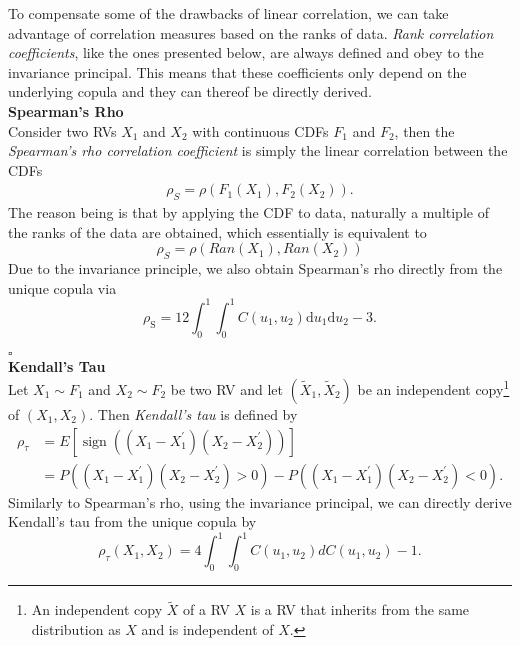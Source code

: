 
To compensate some of the drawbacks of linear correlation, we can take advantage of correlation measures based on the ranks of data. \textit{Rank correlation coefficients}, like the ones presented below, are always defined and obey to the invariance principal. This means that these coefficients only depend on the underlying copula and they can thereof be directly derived.\\

\textbf{Spearman's Rho}\\
Consider two \acp{RV} $X_1$ and $X_2$ with continuous \acp{CDF} $F_1$ and $F_2$, then the \textit{Spearman's rho correlation coefficient} is simply the linear correlation between the \acp{CDF}
\begin{align}
\rho_{S}=\rho\left(F_{1}\left(X_{1}\right), F_{2}\left(X_{2}\right)\right).
\end{align}
The reason being is that by applying the \ac{CDF} to data, naturally a multiple of the ranks of the data are obtained, which essentially is equivalent to
\begin{equation}
\rho_S = \rho ( Ran(X_1), Ran(X_2) )
\end{equation}
Due to the invariance principle, we also obtain Spearman's rho directly from the unique copula via
\begin{equation}
\rho_{\mathrm{S}}=12 \int_{0}^{1} \int_{0}^{1} C\left(u_{1}, u_{2}\right) \mathrm{d} u_{1} \mathrm{d} u_{2}-3.
\end{equation}

\hfill $\square$ \\


\textbf{Kendall's Tau}\\
Let $X_1 \sim F_1$ and $X_2 \sim F_2$ be two \ac{RV} and let $(\tilde{X}_{1}, \tilde{X}_{2})$ be an independent copy\footnote{An independent copy $\tilde{X}$ of a RV $X$ is a RV that inherits from the same distribution as $X$ and is independent of $X$.} of $({X}_{1}, {X}_{2})$. Then \textit{Kendall's tau} is defined by 
\begin{equation}
\begin{aligned}
\rho_{\tau} &={E}\left[\operatorname{sign}\left(\left(X_{1}-X_{1}^{\prime}\right)\left(X_{2}-X_{2}^{\prime}\right)\right)\right] \\
&={P}\left(\left(X_{1}-X_{1}^{\prime}\right)\left(X_{2}-X_{2}^{\prime}\right)>0\right)-{P}\left(\left(X_{1}-X_{1}^{\prime}\right)\left(X_{2}-X_{2}^{\prime}\right)<0\right).
\end{aligned}
\end{equation}
Similarly to Spearman's rho, using the invariance principal, we can directly derive Kendall's tau from the unique copula by
\begin{equation}
\rho_{\tau}\left(X_{1}, X_{2}\right)=4 \int_{0}^{1} \int_{0}^{1} C\left(u_{1}, u_{2}\right) d C\left(u_{1}, u_{2}\right)-1.
\label{eq:kendall_to_copula}
\end{equation}

